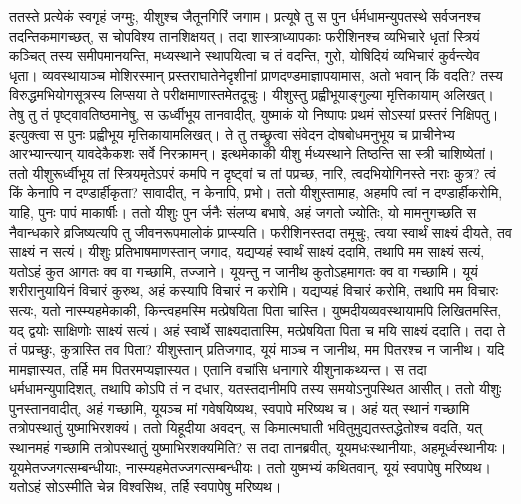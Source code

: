 \adhyAya
{}
\vakya ततस्ते प्रत्येकं स्वगृहं जग्मुः, यीशुश्च जैतूनगिरिं जगाम।
\vakya प्रत्यूषे तु स पुन र्धर्मधामन्युपतस्थे सर्वजनश्च तदन्तिकमागच्छत्, स चोपविश्य तानशिक्षयत्।
\vakya तदा शास्त्राध्यापकाः फरीशिनश्च व्यभिचारे धृतां स्त्रियं कञ्चित् तस्य समीपमानयन्ति, मध्यस्थाने स्थापयित्वा च तं वदन्ति,
\vakya गुरो, योषिदियं व्यभिचारं कुर्वन्त्येव धृता।
\vakya व्यवस्थायाञ्च मोशिरस्मान् प्रस्तराघातेनेदृशीनां प्राणदण्डमाज्ञापयामास, अतो भवान् किं वदति?
\vakya तस्य विरुद्धमभियोगसूत्रस्य लिप्सया ते परीक्षमाणास्तमेतदूचुः। यीशुस्तु प्रह्वीभूयाङ्गुल्या मृत्तिकायाम् अलिखत्।
\vakya तेषु तु तं पृष्ट्वावतिष्ठमानेषु, स ऊर्ध्वीभूय तानवादीत्, युष्माकं यो निष्पापः प्रथमं सोऽस्यां प्रस्तरं निक्षिपतु।
\vakya इत्युक्त्वा स पुनः प्रह्वीभूय मृत्तिकायामलिखत्।
\vakya ते तु तच्छ्रुत्वा संवेदन दोषबोधमनुभूय च प्राचीनेभ्य आरभ्यान्त्यान् यावदेकैकशः सर्वे निरक्रामन्। इत्थमेकाकी यीशु र्मध्यस्थाने तिष्ठन्ति सा स्त्री चाशिष्येतां।
\vakya ततो यीशुरूर्ध्वीभूय तां स्त्रियमृतेऽपरं कमपि न दृष्ट्वां च तां पप्रच्छ, नारि, त्वदभियोगिनस्ते नराः कुत्र? त्वं किं केनापि न दण्डार्हीकृता?
\vakya सावादीत्, न केनापि, प्रभो। ततो यीशुस्तामाह, अहमपि त्वां न दण्डार्हीकरोमि, याहि, पुनः पापं माकार्षीः।
\vakya ततो यीशुः पुन र्जनैः संलप्य बभाषे, अहं जगतो ज्योतिः, यो मामनुगच्छति स नैवान्धकारे व्रजिष्यत्यपि तु जीवनरूपमालोकं प्राप्स्यति।
\vakya फरीशिनस्तदा तमूचुः, त्वया स्वार्थं साक्ष्यं दीयते, तव साक्ष्यं न सत्यं।
\vakya यीशुः प्रतिभाषमाणस्तान् जगाद, यद्यप्यहं स्वार्थं साक्ष्यं ददामि, तथापि मम साक्ष्यं सत्यं, यतोऽहं कुत आगतः क्व वा गच्छामि, तज्जाने। यूयन्तु न जानीथ कुतोऽहमागतः क्व वा गच्छामि।
\vakya यूयं शरीरानुयायिनं विचारं कुरुथ, अहं कस्यापि विचारं न करोमि।
\vakya यद्यप्यहं विचारं करोमि, तथापि मम विचारः सत्यः, यतो नास्म्यहमेकाकी, किन्त्वहमस्मि मत्प्रेषयिता पिता चास्ति।
\vakya युष्मदीयव्यवस्थायामपि लिखितमस्ति, यद् द्वयोः साक्षिणोः साक्ष्यं सत्यं।
\vakya अहं स्वार्थे साक्ष्यदातास्मि, मत्प्रेषयिता पिता च मयि साक्ष्यं ददाति।
\vakya तदा ते तं पप्रच्छुः, कुत्रास्ति तव पिता? यीशुस्तान् प्रतिजगाद, यूयं माञ्च न जानीथ, मम पितरश्च न जानीथ। यदि मामज्ञास्यत, तर्हि मम पितरमप्यज्ञास्यत।
\vakya एतानि वचांसि धनागारे यीशुनाकथ्यन्त। स तदा धर्मधामन्युपादिशत्, तथापि कोऽपि तं न दधार, यतस्तदानीमपि तस्य समयोऽनुपस्थित आसीत्।
\vakya ततो यीशुः पुनस्तानवादीत्, अहं गच्छामि, यूयञ्च मां गवेषयिष्यथ, स्वपापे मरिष्यथ च। अहं यत् स्थानं गच्छामि तत्रोपस्थातुं युष्माभिरशक्यं।
\vakya ततो यिहूदीया अवदन्, स किमात्मघाती भवितुमुद्यतस्तद्धेतोश्च वदति, यत् स्थानमहं गच्छामि तत्रोपस्थातुं युष्माभिरशक्यमिति?
\vakya स तदा तानब्रवीत्, यूयमधःस्थानीयाः, अहमूर्ध्वस्थानीयः। यूयमेतज्जगत्सम्बन्धीयाः, नास्म्यहमेतज्जगत्सम्बन्धीयः।
\vakya ततो युष्मभ्यं कथितवान्, यूयं स्वपापेषु मरिष्यथ। यतोऽहं सोऽस्मीति चेन्न विश्वसिथ, तर्हि स्वपापेषु मरिष्यथ।
